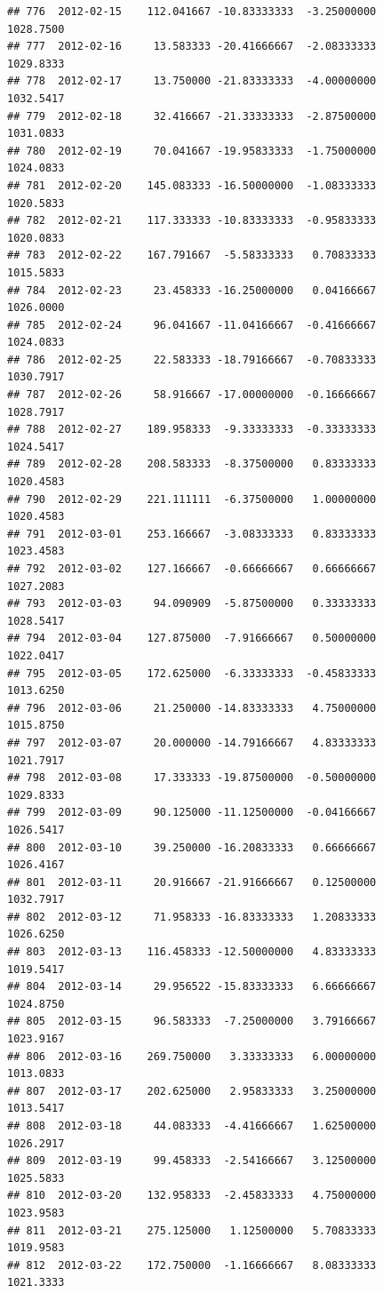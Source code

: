 \documentclass[
]{article}
\begin{document}
\begin{verbatim}
## 776  2012-02-15    112.041667 -10.83333333  -3.25000000    1028.7500
## 777  2012-02-16     13.583333 -20.41666667  -2.08333333    1029.8333
## 778  2012-02-17     13.750000 -21.83333333  -4.00000000    1032.5417
## 779  2012-02-18     32.416667 -21.33333333  -2.87500000    1031.0833
## 780  2012-02-19     70.041667 -19.95833333  -1.75000000    1024.0833
## 781  2012-02-20    145.083333 -16.50000000  -1.08333333    1020.5833
## 782  2012-02-21    117.333333 -10.83333333  -0.95833333    1020.0833
## 783  2012-02-22    167.791667  -5.58333333   0.70833333    1015.5833
## 784  2012-02-23     23.458333 -16.25000000   0.04166667    1026.0000
## 785  2012-02-24     96.041667 -11.04166667  -0.41666667    1024.0833
## 786  2012-02-25     22.583333 -18.79166667  -0.70833333    1030.7917
## 787  2012-02-26     58.916667 -17.00000000  -0.16666667    1028.7917
## 788  2012-02-27    189.958333  -9.33333333  -0.33333333    1024.5417
## 789  2012-02-28    208.583333  -8.37500000   0.83333333    1020.4583
## 790  2012-02-29    221.111111  -6.37500000   1.00000000    1020.4583
## 791  2012-03-01    253.166667  -3.08333333   0.83333333    1023.4583
## 792  2012-03-02    127.166667  -0.66666667   0.66666667    1027.2083
## 793  2012-03-03     94.090909  -5.87500000   0.33333333    1028.5417
## 794  2012-03-04    127.875000  -7.91666667   0.50000000    1022.0417
## 795  2012-03-05    172.625000  -6.33333333  -0.45833333    1013.6250
## 796  2012-03-06     21.250000 -14.83333333   4.75000000    1015.8750
## 797  2012-03-07     20.000000 -14.79166667   4.83333333    1021.7917
## 798  2012-03-08     17.333333 -19.87500000  -0.50000000    1029.8333
## 799  2012-03-09     90.125000 -11.12500000  -0.04166667    1026.5417
## 800  2012-03-10     39.250000 -16.20833333   0.66666667    1026.4167
## 801  2012-03-11     20.916667 -21.91666667   0.12500000    1032.7917
## 802  2012-03-12     71.958333 -16.83333333   1.20833333    1026.6250
## 803  2012-03-13    116.458333 -12.50000000   4.83333333    1019.5417
## 804  2012-03-14     29.956522 -15.83333333   6.66666667    1024.8750
## 805  2012-03-15     96.583333  -7.25000000   3.79166667    1023.9167
## 806  2012-03-16    269.750000   3.33333333   6.00000000    1013.0833
## 807  2012-03-17    202.625000   2.95833333   3.25000000    1013.5417
## 808  2012-03-18     44.083333  -4.41666667   1.62500000    1026.2917
## 809  2012-03-19     99.458333  -2.54166667   3.12500000    1025.5833
## 810  2012-03-20    132.958333  -2.45833333   4.75000000    1023.9583
## 811  2012-03-21    275.125000   1.12500000   5.70833333    1019.9583
## 812  2012-03-22    172.750000  -1.16666667   8.08333333    1021.3333

\end{verbatim}
\end{document}
